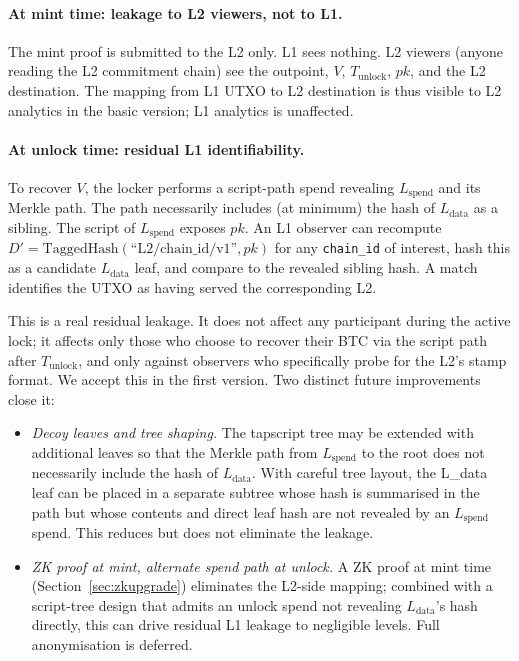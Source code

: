 \documentclass[11pt,a4paper]{article}
\begin{document}
\paragraph{At mint time: leakage to L2 viewers, not to L1.} The mint proof is submitted to the L2 only. L1 sees nothing. L2 viewers (anyone reading the L2 commitment chain) see the outpoint, $V$, $T_{\mathrm{unlock}}$, $pk$, and the L2 destination. The mapping from L1 UTXO to L2 destination is thus visible to L2 analytics in the basic version; L1 analytics is unaffected.

\paragraph{At unlock time: residual L1 identifiability.} To recover $V$, the locker performs a script-path spend revealing $L_{\mathrm{spend}}$ and its Merkle path. The path necessarily includes (at minimum) the hash of $L_{\mathrm{data}}$ as a sibling. The script of $L_{\mathrm{spend}}$ exposes $pk$. An L1 observer can recompute $D' = \mathrm{TaggedHash}(\text{``L2/chain\_id/v1''}, pk)$ for any \texttt{chain\_id} of interest, hash this as a candidate $L_{\mathrm{data}}$ leaf, and compare to the revealed sibling hash. A match identifies the UTXO as having served the corresponding L2.

This is a real residual leakage. It does not affect any participant during the active lock; it affects only those who choose to recover their BTC via the script path after $T_{\mathrm{unlock}}$, and only against observers who specifically probe for the L2's stamp format. We accept this in the first version. Two distinct future improvements close it:

\begin{itemize}[leftmargin=*]
  \item \emph{Decoy leaves and tree shaping.} The tapscript tree may be extended with additional leaves so that the Merkle path from $L_{\mathrm{spend}}$ to the root does not necessarily include the hash of $L_{\mathrm{data}}$. With careful tree layout, the L_data leaf can be placed in a separate subtree whose hash is summarised in the path but whose contents and direct leaf hash are not revealed by an $L_{\mathrm{spend}}$ spend. This reduces but does not eliminate the leakage.
  \item \emph{ZK proof at mint, alternate spend path at unlock.} A ZK proof at mint time (Section~\ref{sec:zkupgrade}) eliminates the L2-side mapping; combined with a script-tree design that admits an unlock spend not revealing $L_{\mathrm{data}}$'s hash directly, this can drive residual L1 leakage to negligible levels. Full anonymisation is deferred.
\end{itemize}
\end{document}
